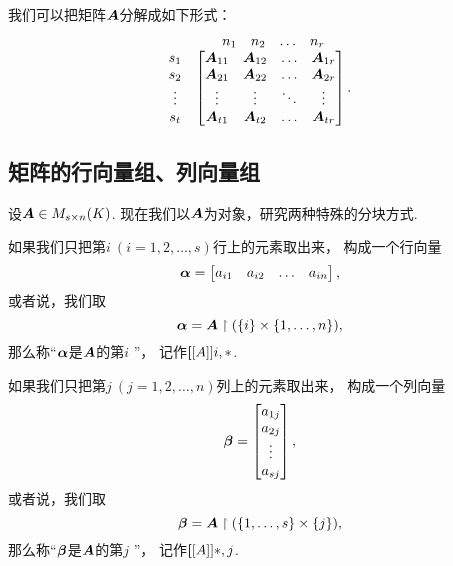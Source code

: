 我们可以把矩阵\(\boldsymbol{A}\)分解成如下形式：
\begin{equation*}
	\begin{matrix}
		& \begin{matrix} n_1 & n_2 & \dots & n_r \end{matrix} \\
			\begin{matrix} s_1 \\ s_2 \\ \vdots \\ s_t \end{matrix} & \begin{bmatrix}
			\boldsymbol{A}_{11} & \boldsymbol{A}_{12} & \dots & \boldsymbol{A}_{1r} \\
			\boldsymbol{A}_{21} & \boldsymbol{A}_{22} & \dots & \boldsymbol{A}_{2r} \\
			\vdots & \vdots & \ddots & \vdots \\
			\boldsymbol{A}_{t1} & \boldsymbol{A}_{t2} & \dots & \boldsymbol{A}_{tr}
		\end{bmatrix}.
	\end{matrix}
\end{equation*}

\subsection{矩阵的行向量组、列向量组}
设\(\boldsymbol{A}\in M_{s \times n}(K)\).
现在我们以\(\boldsymbol{A}\)为对象，研究两种特殊的分块方式.

如果我们只把第\(i\ (i=1,2,\dotsc,s)\)行上的元素取出来，
构成一个行向量\begin{equation*}
	\boldsymbol\alpha=\begin{bmatrix}
		a_{i1} & a_{i2} & \dots & a_{in}
	\end{bmatrix},
\end{equation*}
或者说，我们取\begin{equation*}
	\boldsymbol\alpha=\boldsymbol{A}\upharpoonright(\{i\}\times\{1,\dotsc,n\}),
\end{equation*}
那么称“\(\boldsymbol\alpha\)是\(\boldsymbol{A}\)的第\(i\) ”，
记作\(\boldsymbol[[A]]{i,*}\).

如果我们只把第\(j\ (j=1,2,\dotsc,n)\)列上的元素取出来，
构成一个列向量\begin{equation*}
	\boldsymbol\beta=\begin{bmatrix}
		a_{1j} \\ a_{2j} \\ \vdots \\ a_{sj}
	\end{bmatrix},
\end{equation*}
或者说，我们取\begin{equation*}
	\boldsymbol\beta=\boldsymbol{A}\upharpoonright(\{1,\dotsc,s\}\times\{j\}),
\end{equation*}
那么称“\(\boldsymbol\beta\)是\(\boldsymbol{A}\)的第\(j\) ”，
记作\(\boldsymbol[[A]]{*,j}\).

